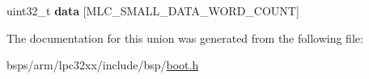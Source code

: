 \begin{DoxyCompactItemize}
\begin{tabbing}
\end{tabbing}\item 
\mbox{\label{unionlpc32xx__boot__block_ae108125396d771e7c6d1b3337eedaf60}} 
uint32\+\_\+t {\bfseries data} \mbox{[}M\+L\+C\+\_\+\+S\+M\+A\+L\+L\+\_\+\+D\+A\+T\+A\+\_\+\+W\+O\+R\+D\+\_\+\+C\+O\+U\+NT\mbox{]}
\end{DoxyCompactItemize}


The documentation for this union was generated from the following file\+:\begin{DoxyCompactItemize}
\item 
bsps/arm/lpc32xx/include/bsp/\mbox{\hyperlink{arm_2lpc32xx_2include_2bsp_2boot_8h}{boot.\+h}}\end{DoxyCompactItemize}
